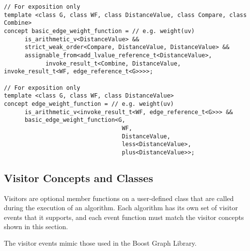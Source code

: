 \begin{lstlisting}
// For exposition only
template <class G, class WF, class DistanceValue, class Compare, class Combine>
concept basic_edge_weight_function = // e.g. weight(uv)
      is_arithmetic_v<DistanceValue> && 
      strict_weak_order<Compare, DistanceValue, DistanceValue> &&
      assignable_from<add_lvalue_reference_t<DistanceValue>,
            invoke_result_t<Combine, DistanceValue, invoke_result_t<WF, edge_reference_t<G>>>>;

// For exposition only
template <class G, class WF, class DistanceValue>
concept edge_weight_function = // e.g. weight(uv)
      is_arithmetic_v<invoke_result_t<WF, edge_reference_t<G>>> &&
      basic_edge_weight_function<G,
                                  WF,
                                  DistanceValue,
                                  less<DistanceValue>,
                                  plus<DistanceValue>>;
\end{lstlisting}

\begin{comment}
      \phil{Queueable isn't being used.}
      \begin{lstlisting}
      // queueableQ can represent std::queue and std::priority\_queue
      template <class Q>
      concept queueable = requires(Q&& q, Q::value_type value) {
      Q::value_type;
      Q::size_type;
      Q::reference;

      {q.top()};
      {q.push(value)};
      {q.pop()};
      {q.empty()};
      {q.size()};
      };
      \end{lstlisting}
\end{comment}

\subsection{Visitor Concepts and Classes}
Visitors are optional member functions on a user-defined class that are called during the execution of an algorithm. 
Each algorithm has its own set of visitor events that it supports, and each event function must match the visitor concepts 
shown in this section.

The visitor events mimic those used in the Boost Graph Library.

